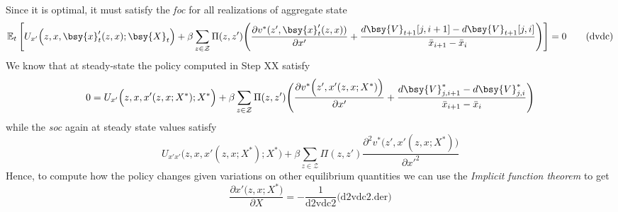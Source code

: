 \documentclass[a4paper,10pt]{article}  %
\begin{document}
Since it is optimal, it must satisfy the \emph{foc} for all realizations of aggregate state
\begin{equation}
   \label{eq:foc}
   \mathbb{E}_t 
   \left[
   U_{x'} \Big( z, x, \bsy{x}_t'(z,x); \bsy{X}_t \Big) + \beta
      \sum_{z \in \mathcal{Z} }  \Pi(z,z')
      \Bigg( 
         \frac{ \partial v^*(z', \bsy{x}_t'(z,x) ) }{ \partial x' } + 
         \frac{ d \bsy{V}_{t+1}[j,i+1 ] - d \bsy{V}_{t+1}[j,i] }{ \bar{x}_{i+1} - \bar{x}_{i} }
       \Bigg)
   \right] = 0
   \tag{dvdc}
\end{equation}
We know that at steady-state the policy computed in Step XX satisfy
\begin{equation*}
   \label{eq:focstst}
   0 = U_{x'} \Big( z, x, x'(z,x; X^*); X^* \Big) + \beta 
      \sum_{z \in \mathcal{Z} }  \Pi(z,z')
      \Bigg( 
         \frac{ \partial v^* \Big(z', x'(z,x; X^*) \Big) }{ \partial x' } +
         \frac{ d \bsy{V}^*_{j,i+1} - d \bsy{V}^*_{j,i} }{ \bar{x}_{i+1} - \bar{x}_{i} }
       \Bigg)
\end{equation*}
while the \emph{soc} again at steady state values satisfy
\begin{equation}
   \label{eq:soc}
   U_{x'x'} \Big( z,x, x'(z,x; X^*) ; X^* \Big) + \beta 
         \sum_{z \in \mathcal{Z} }  \Pi(z,z')
         \frac{ \partial^2 v^*\Big( z', x'(z,x; X^*) \Big)}{ \partial {x'}^2}
   \tag{d2vdc2}
\end{equation}
Hence, to compute how the policy changes given variations on other equilibrium quantities we can use
the \emph{Implicit function theorem} to get
\begin{equation}
   \label{eq:}
   \frac{ \partial x' \Big( z,x ; X^* \Big) }{ \partial X }  = - \frac{1}{ \text{d2vdc2} } \Big( \text{d2vdc2.der} \Big)
\end{equation}

\end{document}
